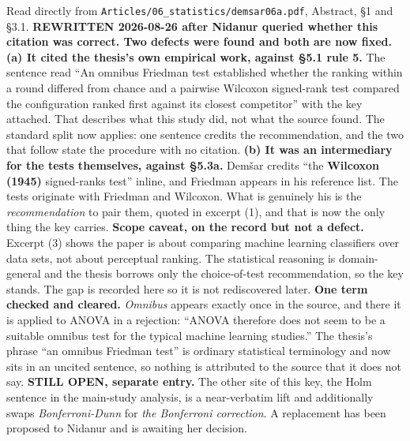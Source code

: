 \documentclass[11pt, a4paper]{article}
\begin{document}
\begin{Form}
  {Read directly from \texttt{\footnotesize Articles/06\_statistics/demsar06a.pdf}, Abstract, \S1 and \S3.1. \textbf{REWRITTEN 2026-08-26 after Nidanur queried whether this citation was correct. Two defects were found and both are now fixed.} \textbf{(a) It cited the thesis's own empirical work, against \S5.1 rule 5.} The sentence read ``An omnibus Friedman test established whether the ranking within a round differed from chance and a pairwise Wilcoxon signed-rank test compared the configuration ranked first against its closest competitor'' with the key attached. That describes what this study did, not what the source found. The standard split now applies: one sentence credits the recommendation, and the two that follow state the procedure with no citation. \textbf{(b) It was an intermediary for the tests themselves, against \S5.3a.} Dem\v{s}ar credits ``the \textbf{Wilcoxon (1945)} signed-ranks test'' inline, and Friedman appears in his reference list. The tests originate with Friedman and Wilcoxon. What is genuinely his is the \emph{recommendation} to pair them, quoted in excerpt (1), and that is now the only thing the key carries. \textbf{Scope caveat, on the record but not a defect.} Excerpt (3) shows the paper is about comparing machine learning classifiers over data sets, not about perceptual ranking. The statistical reasoning is domain-general and the thesis borrows only the choice-of-test recommendation, so the key stands. The gap is recorded here so it is not rediscovered later. \textbf{One term checked and cleared.} \emph{Omnibus} appears exactly once in the source, and there it is applied to ANOVA in a rejection: ``ANOVA therefore does not seem to be a suitable omnibus test for the typical machine learning studies.'' The thesis's phrase ``an omnibus Friedman test'' is ordinary statistical terminology and now sits in an uncited sentence, so nothing is attributed to the source that it does not say. \textbf{STILL OPEN, separate entry.} The other site of this key, the Holm sentence in the main-study analysis, is a near-verbatim lift and additionally swaps \emph{Bonferroni-Dunn} for \emph{the Bonferroni correction}. A replacement has been proposed to Nidanur and is awaiting her decision.}


\end{Form}
\end{document}
